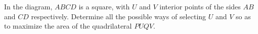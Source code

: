 In the diagram, $ ABCD$ is a square, with $ U$ and $ V$ interior points of the sides $ AB$ and $ CD$ respectively. Determine all the possible ways of selecting $ U$ and $ V$ so as to maximize the area of the quadrilateral $ PUQV$.
